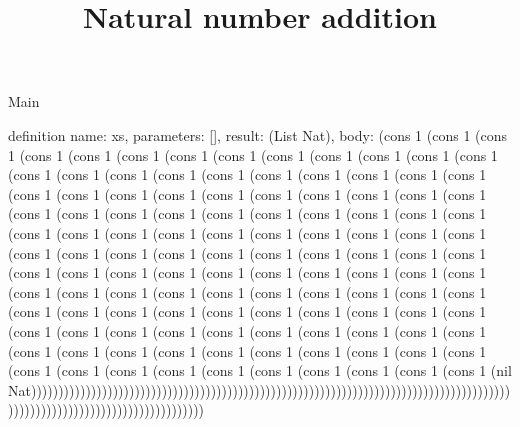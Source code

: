 \begin{lexlean}{Main}
\title{Natural number addition}
\begin{semanticmodule}
definition{ name: xs, parameters: [], result: (List Nat), body: (cons 1 (cons 1 (cons 1 (cons 1 (cons 1 (cons 1 (cons 1 (cons 1 (cons 1 (cons 1 (cons 1 (cons 1 (cons 1 (cons 1 (cons 1 (cons 1 (cons 1 (cons 1 (cons 1 (cons 1 (cons 1 (cons 1 (cons 1 (cons 1 (cons 1 (cons 1 (cons 1 (cons 1 (cons 1 (cons 1 (cons 1 (cons 1 (cons 1 (cons 1 (cons 1 (cons 1 (cons 1 (cons 1 (cons 1 (cons 1 (cons 1 (cons 1 (cons 1 (cons 1 (cons 1 (cons 1 (cons 1 (cons 1 (cons 1 (cons 1 (cons 1 (cons 1 (cons 1 (cons 1 (cons 1 (cons 1 (cons 1 (cons 1 (cons 1 (cons 1 (cons 1 (cons 1 (cons 1 (cons 1 (cons 1 (cons 1 (cons 1 (cons 1 (cons 1 (cons 1 (cons 1 (cons 1 (cons 1 (cons 1 (cons 1 (cons 1 (cons 1 (cons 1 (cons 1 (cons 1 (cons 1 (cons 1 (cons 1 (cons 1 (cons 1 (cons 1 (cons 1 (cons 1 (cons 1 (cons 1 (cons 1 (cons 1 (cons 1 (cons 1 (cons 1 (cons 1 (cons 1 (cons 1 (cons 1 (cons 1 (cons 1 (cons 1 (cons 1 (cons 1 (cons 1 (cons 1 (cons 1 (cons 1 (cons 1 (cons 1 (cons 1 (cons 1 (cons 1 (cons 1 (cons 1 (cons 1 (cons 1 (cons 1 (cons 1 (cons 1 (cons 1 (cons 1 (cons 1 (nil Nat)))))))))))))))))))))))))))))))))))))))))))))))))))))))))))))))))))))))))))))))))))))))))))))))))))))))))))))))))))))))))))) }
\end{semanticmodule}
\end{lexlean}
